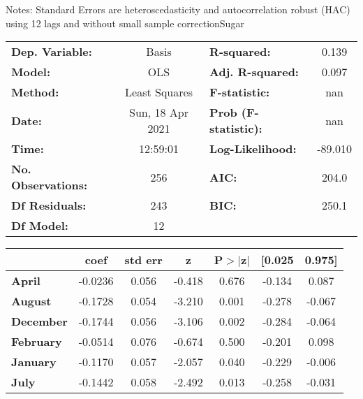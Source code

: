 Notes: \newline
 [1] Standard Errors are heteroscedasticity and autocorrelation robust (HAC) using 12 lags and without small sample correctionSugar\begin{center}
\begin{tabular}{lclc}
\toprule
\textbf{Dep. Variable:}    &      Basis       & \textbf{  R-squared:         } &     0.139   \\
\textbf{Model:}            &       OLS        & \textbf{  Adj. R-squared:    } &     0.097   \\
\textbf{Method:}           &  Least Squares   & \textbf{  F-statistic:       } &       nan   \\
\textbf{Date:}             & Sun, 18 Apr 2021 & \textbf{  Prob (F-statistic):} &      nan    \\
\textbf{Time:}             &     12:59:01     & \textbf{  Log-Likelihood:    } &   -89.010   \\
\textbf{No. Observations:} &         256      & \textbf{  AIC:               } &     204.0   \\
\textbf{Df Residuals:}     &         243      & \textbf{  BIC:               } &     250.1   \\
\textbf{Df Model:}         &          12      & \textbf{                     } &             \\
\bottomrule
\end{tabular}
\begin{tabular}{lcccccc}
                   & \textbf{coef} & \textbf{std err} & \textbf{z} & \textbf{P$> |$z$|$} & \textbf{[0.025} & \textbf{0.975]}  \\
\midrule
\textbf{April}     &      -0.0236  &        0.056     &    -0.418  &         0.676        &       -0.134    &        0.087     \\
\textbf{August}    &      -0.1728  &        0.054     &    -3.210  &         0.001        &       -0.278    &       -0.067     \\
\textbf{December}  &      -0.1744  &        0.056     &    -3.106  &         0.002        &       -0.284    &       -0.064     \\
\textbf{February}  &      -0.0514  &        0.076     &    -0.674  &         0.500        &       -0.201    &        0.098     \\
\textbf{January}   &      -0.1170  &        0.057     &    -2.057  &         0.040        &       -0.229    &       -0.006     \\
\textbf{July}      &      -0.1442  &        0.058     &    -2.492  &         0.013        &       -0.258    &       -0.031     \\

\end{tabular}
\end{center}
